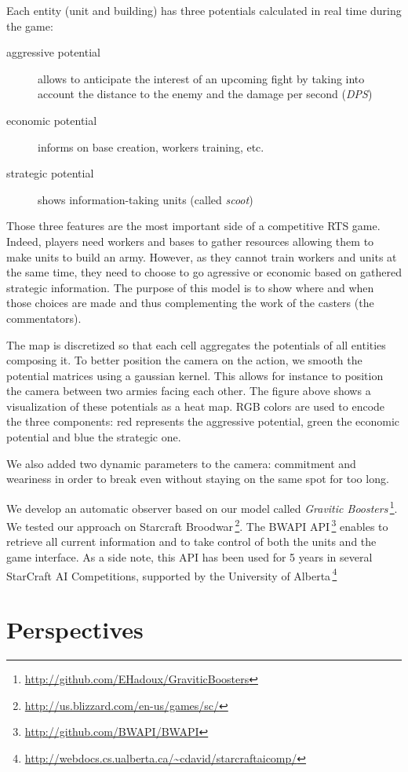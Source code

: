 \documentclass{jfsma}
\begin{document}
Each entity (unit and building) has three potentials calculated in real time during the game:
\begin{description}
\item[aggressive potential] allows to anticipate the interest of an upcoming fight by taking into account the distance to the enemy and the damage per second (\emph{DPS})
\item[economic potential] informs on base creation, workers training, etc.
\item[strategic potential] shows information-taking units (called \emph{scoot}) 
\end{description}
Those three features are the most important side of a competitive RTS game.
Indeed, players need workers and bases to gather resources allowing them to make units to build an army.
However, as they cannot train workers and units at the same time, they need to choose to go agressive or economic based on gathered strategic information.
The purpose of this model is to show where and when those choices are made and thus complementing the work of the casters (the commentators).

The map is discretized so that each cell aggregates the potentials of all entities composing it. 
To better position the camera on the action, we smooth the potential matrices using a gaussian kernel. 
This allows for instance to position the camera between two armies facing each other. 
The figure above shows a visualization of these potentials as a heat map.
RGB colors are used to encode the three components: red represents the aggressive potential, green the economic potential and blue the strategic one.

We also added two dynamic parameters to the camera: commitment and weariness in order to break even without staying on the same spot for too long.

We develop an automatic observer based on our model called \emph{Gravitic Boosters}\,\footnote{\url{http://github.com/EHadoux/GraviticBoosters}}.
We tested our approach on Starcraft Broodwar\,\footnote{\url{http://us.blizzard.com/en-us/games/sc/}}. 
The BWAPI API\,\footnote{\url{http://github.com/BWAPI/BWAPI}} enables to retrieve all current information and to take control of both the units and the game interface.
As a side note, this API has been used for 5 years in several StarCraft AI Competitions, supported by the University of Alberta\,\footnote{\url{http://webdocs.cs.ualberta.ca/~cdavid/starcraftaicomp/}}  

\section{Perspectives}
\end{document}
